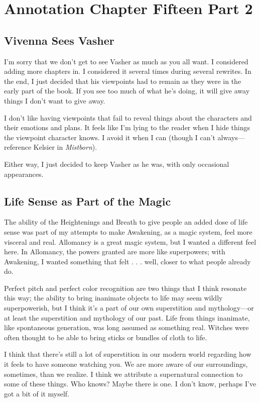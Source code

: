 \section{Annotation Chapter Fifteen Part 2}

\subsection*{Vivenna Sees Vasher}

I’m sorry that we don’t get to see Vasher as much as you all want. I considered adding more chapters in. I considered it several times during several rewrites. In the end, I just decided that his viewpoints had to remain as they were in the early part of the book. If you see too much of what he’s doing, it will give away things I don’t want to give away.

I don’t like having viewpoints that fail to reveal things about the characters and their emotions and plans. It feels like I’m lying to the reader when I hide things the viewpoint character knows. I avoid it when I can (though I can’t always—reference Kelsier in \textit{Mistborn}).

Either way, I just decided to keep Vasher as he was, with only occasional appearances.

\subsection*{Life Sense as Part of the Magic}

The ability of the Heightenings and Breath to give people an added dose of life sense was part of my attempts to make Awakening, as a magic system, feel more visceral and real. Allomancy is a great magic system, but I wanted a different feel here. In Allomancy, the powers granted are more like superpowers; with Awakening, I wanted something that felt . . . well, closer to what people already do.

Perfect pitch and perfect color recognition are two things that I think resonate this way; the ability to bring inanimate objects to life may seem wildly superpowerish, but I think it’s a part of our own superstition and mythology—or at least the superstition and mythology of our past. Life from things inanimate, like spontaneous generation, was long assumed as something real. Witches were often thought to be able to bring sticks or bundles of cloth to life.

I think that there’s still a lot of superstition in our modern world regarding how it feels to have someone watching you. We are more aware of our surroundings, sometimes, than we realize. I think we attribute a supernatural connection to some of these things. Who knows? Maybe there is one. I don’t know, perhaps I’ve got a bit of it myself.


